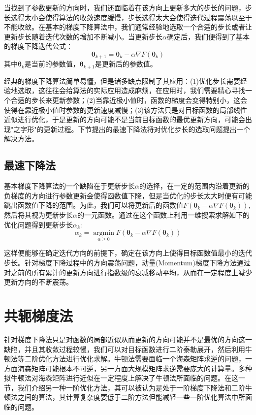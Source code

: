 \documentclass{ctexart}
\begin{document}
当找到了参数更新的方向时，我们还面临着在该方向上更新多大的步长的问题，步长选得太小会使得算法的收敛速度缓慢，步长选得太大会使得迭代过程震荡以至于不能收敛。在基本的梯度下降算法中，我们通常经验地选取一个合适的步长或者让更新步长随着迭代次数的增加不断减小。当更新步长$\alpha$确定后，我们便得到了基本的梯度下降迭代公式：
\begin{equation}
\boldsymbol{\theta}_{k+1}=\boldsymbol{\theta}_k-\alpha\nabla F(\boldsymbol{\theta}_k)
\end{equation}\label{GD}
其中$\boldsymbol{\theta}_k$是当前的参数值，$\boldsymbol{\theta}_{k+1}$是更新后的参数值。


经典的梯度下降算法简单易懂，但是诸多缺点限制了其应用：(1)优化步长需要经验地选取，这往往会给算法的实际应用造成麻烦，在应用时，我们需要精心寻找一个合适的步长来更新参数；(2)当靠近极小值时，函数的梯度会变得特别小，这会使得在靠近极小值时参数的更新速度减慢；(3)该方法只是对目标函数的局部线性近似进行优化，于是更新的方向可能不是当前目标函数的最优更新方向，可能会出现"之字形"的更新过程。下节提出的最速下降法将对优化步长的选取问题提出一个解决方法。
\subsection{最速下降法}
基本梯度下降算法的一个缺陷在于更新步长$\alpha$的选择，在一定的范围内沿着更新的负梯度的方向进行参数更新会使得函数值下降，但是当优化的步长太大时便有可能跳出函数值下降的范围。为此，我们可以将更新后的函数值$F(\boldsymbol{\theta}_{k}-\alpha \nabla{F}({\boldsymbol{\theta}_{k}}))$,然后将其视为更新步长$\alpha$的一元函数。通过在这个函数上利用一维搜索求解如下的优化问题得到更新步长$\alpha_k$:
\begin{equation}
\alpha_k = \mathop{\arg \min}\limits_{\alpha\geqslant 0}F(\boldsymbol{\theta}_{k}-\alpha \nabla{F}({\boldsymbol{\theta}_{k}}))
\end{equation}


这样便能够在确定迭代方向的前提下，确定在该方向上使得目标函数值最小的迭代步长。针对梯度下降过程中的方向震荡问题，动量(Momentum)梯度下降方法通过对之前的所有累计的更新方向进行指数级的衰减移动平均，从而在一定程度上减少更新方向的不断震荡。
\section{共轭梯度法}
针对梯度下降法只是对函数的局部近似从而更新的方向可能并不是最优的方向这一缺陷，并且其收敛过程较慢，我们可以对目标函数进行二阶泰勒展开，然后利用牛顿法等二阶优化方法进行优化求解。牛顿法需要面临一个海森矩阵求逆的问题，一方面海森矩阵可能根本不可逆，另一方面大规模矩阵求逆需要庞大的计算量。多种拟牛顿法对海森矩阵进行近似在一定程度上解决了牛顿法所面临的问题。在这一节，我们介绍另一种一阶优化方法，其可以被认为是处于一阶梯度下降法和二阶牛顿法之间的算法，其计算复杂度要低于二阶方法但能减轻一些一阶优化算法中所面临的问题。
\end{document}
